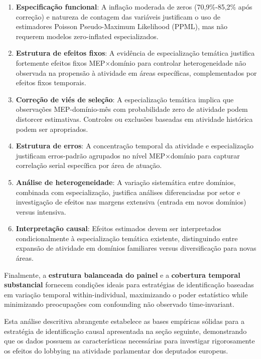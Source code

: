 \begin{enumerate}
    \item \textbf{Especificação funcional}: A inflação moderada de zeros (70,9\%-85,2\% após correção) e natureza de contagem das variáveis justificam o uso de estimadores Poisson Pseudo-Maximum Likelihood (PPML), mas não requerem modelos zero-inflated especializados.
    
    \item \textbf{Estrutura de efeitos fixos}: A evidência de especialização temática justifica fortemente efeitos fixos MEP×domínio para controlar heterogeneidade não observada na propensão à atividade em áreas específicas, complementados por efeitos fixos temporais.
    
    \item \textbf{Correção de viés de seleção}: A especialização temática implica que observações MEP-domínio-mês com probabilidade zero de atividade podem distorcer estimativas. Controles ou exclusões baseadas em atividade histórica podem ser apropriados.
    
    \item \textbf{Estrutura de erros}: A concentração temporal da atividade e especialização justificam erros-padrão agrupados no nível MEP×domínio para capturar correlação serial específica por área de atuação.
    
    \item \textbf{Análise de heterogeneidade}: A variação sistemática entre domínios, combinada com especialização, justifica análises diferenciadas por setor e investigação de efeitos nas margens extensiva (entrada em novos domínios) versus intensiva.
    
    \item \textbf{Interpretação causal}: Efeitos estimados devem ser interpretados condicionalmente à especialização temática existente, distinguindo entre expansão de atividade em domínios familiares versus diversificação para novas áreas.
\end{enumerate}

Finalmente, a \textbf{estrutura balanceada do painel} e a \textbf{cobertura temporal substancial} fornecem condições ideais para estratégias de identificação baseadas em variação temporal within-individual, maximizando o poder estatístico while minimizando preocupações com confounding não observado time-invariant.

Esta análise descritiva abrangente estabelece as bases empíricas sólidas para a estratégia de identificação causal apresentada na seção seguinte, demonstrando que os dados possuem as características necessárias para investigar rigorosamente os efeitos do lobbying na atividade parlamentar dos deputados europeus.
